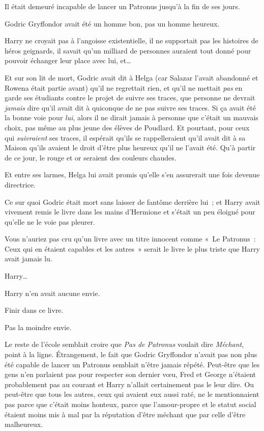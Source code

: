 Il était demeuré incapable de lancer un Patronus jusqu'à la fin de ses jours.

Godric Gryffondor avait été un homme bon, pas un homme heureux.

Harry ne croyait pas à l'angoisse existentielle, il ne supportait pas les histoires de héros geignards, il savait qu'un milliard de personnes auraient tout donné pour pouvoir échanger leur place avec lui, et…

Et sur son lit de mort, Godric avait dit à Helga (car Salazar l'avait abandonné et Rowena était partie avant) qu'il ne regrettait rien, et qu'il ne mettait \emph{pas} en garde ses étudiants contre le projet de suivre ses traces, que personne ne devrait \emph{jamais} dire qu'il avait dit à quiconque de ne pas suivre ses traces. Si ça avait été la bonne voie pour \emph{lui}, alors il ne dirait jamais à personne que c'était un mauvais choix, pas même au plus jeune des élèves de Poudlard. Et pourtant, pour ceux qui \emph{suivraient} ses traces, il espérait qu'ils se rappelleraient qu'il avait dit à sa Maison qu'ils avaient le droit d'être plus heureux qu'il ne l'avait été. Qu'à partir de ce jour, le rouge et or seraient des couleurs chaudes.

Et entre ses larmes, Helga lui avait promis qu'elle s'en assurerait une fois devenue directrice.

Ce sur quoi Godric était mort sans laisser de fantôme derrière lui~; et Harry avait vivement remis le livre dans les mains d'Hermione et s'était un peu éloigné pour qu'elle ne le voie pas pleurer.

Vous n'auriez pas cru qu'un livre avec un titre innocent comme «~Le Patronus~: Ceux qui en étaient capables et les autres~» serait le livre le plus triste que Harry avait jamais lu.

Harry…

Harry n'en avait aucune envie.

Finir dans ce livre.

Pas la moindre envie.

Le reste de l'école semblait croire que \emph{Pas de Patronus} voulait dire \emph{Méchant}, point à la ligne. Étrangement, le fait que Godric Gryffondor n'avait pas non plus été capable de lancer un Patronus semblait n'être jamais répété. Peut-être que les gens n'en parlaient pas pour respecter son dernier vœu, Fred et George n'étaient probablement pas au courant et Harry n'allait certainement pas le leur dire. Ou peut-être que tous les autres, ceux qui avaient eux aussi raté, ne le mentionnaient pas parce que c'était moins honteux, parce que l'amour-propre et le statut social étaient moins mis à mal par la réputation d'être méchant que par celle d'être malheureux.

